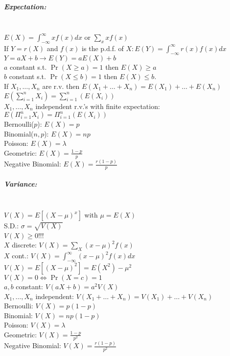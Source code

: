 \documentclass[landscape,10pt]{article}
\begin{document}
\begin{multicols}{4}
\subparagraph*{Expectation: } \ \ \\
\( E(X) = \int_{-\infty}^{\infty}{x f(x)dx}\) or \(\sum\limits_{x}xf(x)\) \\
If \(Y = r(X)\) and \(f(x)\) is the p.d.f. of \(X: E(Y) = \int_{-\infty}^{\infty}{r(x)f(x)dx}\) \\
\(Y = aX + b \rightarrow E(Y) = aE(X)+b\) \\
\(a\) constant s.t. \(\Pr(X \geq a) = 1\) then \(E(X) \geq a\) \\
\(b\) constant s.t. \(\Pr(X \leq b) = 1\) then \(E(X) \leq b\). \\
If \(X_1, \ldots, X_n \) are r.v. then \(E(X_1+\ldots+X_n) = E(X_1) + \ldots +E(X_n)\) \\
\(E\left( \sum_{i = 1}^{n}X_i \right) = \sum_{i = 1}^{n}(E(X_i))\) \\ 
\(X_1, \ldots, X_n\) independent r.v.'s with finite expectation: \(E\left(\Pi_{i=1}^{n}{X_i} \right) = \Pi_{i=1}^{n}\left(E(X_i)\right)\) \\
Bernoulli(\(p\)): \(E(X) = p\) \\ 
Binomial(\(n,p\)): \(E(X) = np\) \\
Poisson: \(E(X) = \lambda\) \\ 
Geometric: \(E(X) = \frac{1-p}{p}\) \\
Negative Binomial: \(E(X) = \frac{r(1-p)}{p}\) 

\subparagraph*{Variance: } \ \ \\
\(V(X) = E[(X-\mu)^x]\) with \(\mu = E(X)\) \\
S.D.: \(\sigma = \sqrt{V(X)}\) \\ 
\(V(X) \geq 0\)!!! \\ 
\(X\) discrete: \(V(X) = \sum\limits_X{(x-\mu)^2f(x)}\) \\ 
\(X\) cont.: \(V(X) = \int_{-\infty}^{\infty}{(x-\mu)^2f(x)dx}\) \\ 
\(V(X) = E[(X-\mu)^2] = E(X^2) - \mu^2\) \\ 
\(V(X) = 0 \iff \Pr(X = c) = 1\) \\
\(a, b\) constant: \(V(aX+b) = a^2V(X)\) \\ 
\(X_1,\ldots,X_n\) independent: \(V(X_1+\ldots+X_n) = V(X_1)+ \ldots + V(X_n)\) \\
Bernoulli: \(V(X) = p(1-p)\) \\ 
Binomial: \(V(X) = np(1-p)\) \\
Poisson: \(V(X) = \lambda\) \\
Geometric: \(V(X) = \frac{1-p}{p^2}\) \\
Negative Binomial: \(V(X) = \frac{r(1-p)}{p^2}\) 



\end{multicols}
\end{document}
